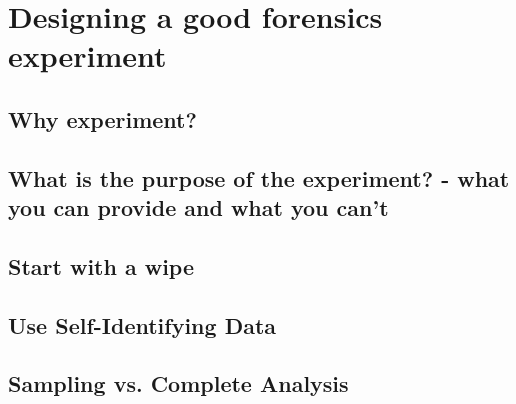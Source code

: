 \chapter{Designing a good forensics experiment}
\section{Why experiment?}
\section{What is the purpose of the experiment? - what you can provide and what you can't}
\section{Start with a wipe}
\section{Use Self-Identifying Data}
\section{Sampling vs. Complete Analysis}
